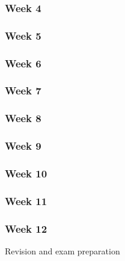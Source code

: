 


%

\subsubsection*{Week 4}



\subsubsection*{Week 5}



\subsubsection*{Week 6}



\subsubsection*{Week 7}



\subsubsection*{Week 8}



\subsubsection*{Week 9}



\subsubsection*{Week 10}



\subsubsection*{Week 11}



\subsubsection*{Week 12}

Revision and exam preparation
%





